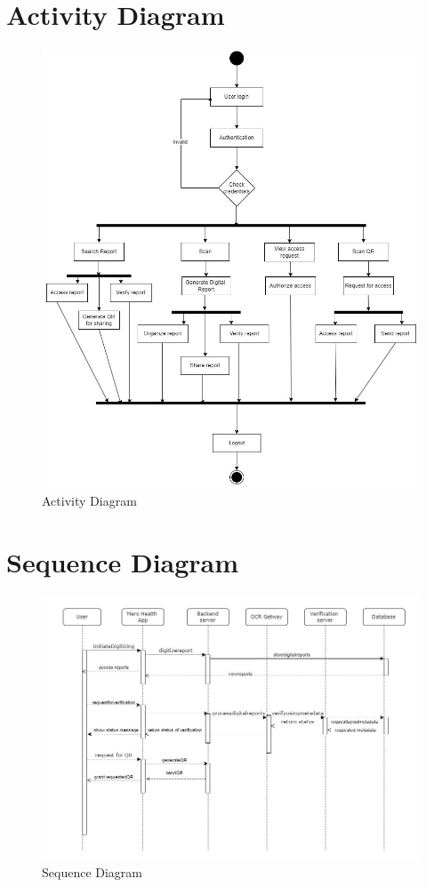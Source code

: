 \section{Activity Diagram}
\begin{figure}[h]
    \centering
    \includegraphics[width=145mm]{figures/Activity.jpg}
    \caption{Activity Diagram}
\end{figure}
\newpage
\section{Sequence Diagram}
\begin{figure}[h]
    \centering
    \includegraphics[width=160mm]{figures/Sequence.jpg}
    \caption{Sequence Diagram}
\end{figure}
\newpage
